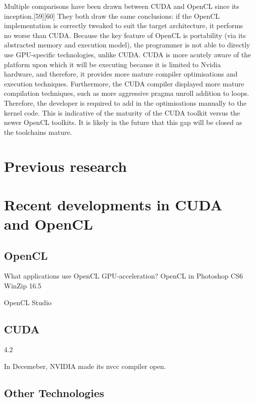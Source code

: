 Multiple comparisons have been drawn between CUDA and OpenCL since its inception.[59][60] They both draw the same conclusions: if the OpenCL implementation is correctly tweaked to suit the target architecture, it performs no worse than CUDA. Because the key feature of OpenCL is portability (via its abstracted memory and execution model), the programmer is not able to directly use GPU-specific technologies, unlike CUDA. CUDA is more acutely aware of the platform upon which it will be executing because it is limited to Nvidia hardware, and therefore, it provides more mature compiler optimisations and execution techniques. Furthermore, the CUDA compiler displayed more mature compilation techniques, such as more aggressive pragma unroll addition to loops. Therefore, the developer is required to add in the optimisations manually to the kernel code. This is indicative of the maturity of the CUDA toolkit versus the newer OpenCL toolkits. It is likely in the future that this gap will be closed as the toolchains mature.

\section{Previous research}



\section{Recent developments in CUDA and OpenCL}
\subsection{OpenCL}

What applications use OpenCL GPU-acceleration?
OpenCL in Photoshop CS6
WinZip 16.5

OpenCL Studio


\subsection{CUDA}

4.2

In Decemeber, NVIDIA made its nvcc compiler open.

\subsection{Other Technologies}
